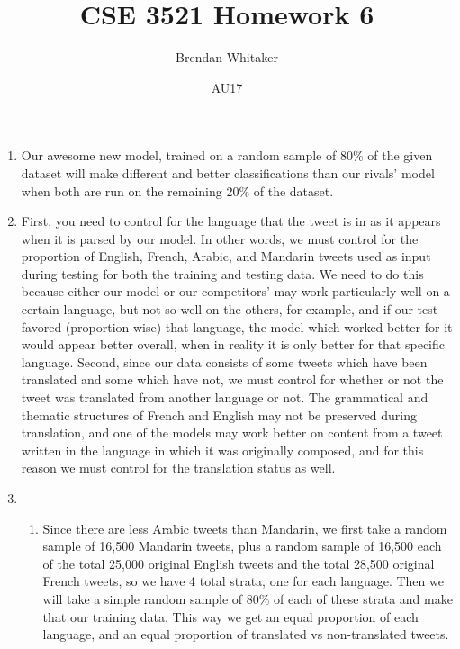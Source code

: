 \documentclass[10pt,oneside,reqno]{amsart}
\theoremstyle{plain}
\theoremstyle{definition}
\begin{document}
\title{CSE 3521 Homework 6}

\date{AU17}

\author[Brendan Whitaker]{Brendan Whitaker}

\maketitle

\begin{enumerate}[label=\arabic*.]

\item Our awesome new model, trained on a random sample of 80\% of the given dataset will make different and better classifications than our rivals' model when both are run on the remaining 20\% of the dataset. \\

\item First, you need to control for the language that the tweet is in as it appears when it is parsed by our model. In other words, we must control for the proportion of English, French, Arabic, and Mandarin tweets used as input during testing for both the training and testing data. We need to do this because either our model or our competitors' may work particularly well on a certain language, but not so well on the others, for example, and if our test favored (proportion-wise) that language, the model which worked better for it would appear better overall, when in reality it is only better for that specific language. Second, since our data consists of some tweets which have been translated and some which have not, we must control for whether or not the tweet was translated from another language or not. The grammatical and thematic structures of French and English may not be preserved during translation, and one of the models may work better on content from a tweet written in the language in which it was originally composed, and for this reason we must control for the translation status as well. \\

\item 

\begin{enumerate}

\item Since there are less Arabic tweets than Mandarin, we first take a random sample of 16,500 Mandarin tweets, plus a random sample of 16,500 each of the total 25,000 original English tweets and the total 28,500 original French tweets, so we have 4 total strata, one for each language. Then we will take a simple random sample of 80\% of each of these strata and make that our training data. This way we get an equal proportion of each language, and an equal proportion of translated vs non-translated tweets. \\


\end{enumerate}
\end{enumerate}
\end{document}
